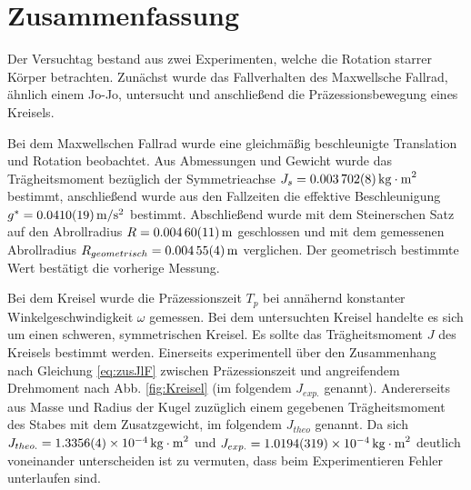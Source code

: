 
\section{Zusammenfassung}\label{kap:Zusammenfassung}

Der Versuchtag bestand aus zwei Experimenten, welche die Rotation starrer Körper betrachten. Zunächst wurde das Fallverhalten des Maxwellsche Fallrad, ähnlich einem Jo-Jo, untersucht und anschließend die Präzessionsbewegung eines Kreisels. 



Bei dem Maxwellschen Fallrad wurde eine gleichmäßig beschleunigte Translation und Rotation beobachtet.
Aus Abmessungen und Gewicht wurde das Trägheitsmoment bezüglich der Symmetrieachse $J_s=\SI{0.003702 \pm 0.000008}{kg\cdot m^2}$ bestimmt, anschließend wurde aus den Fallzeiten die effektive Beschleunigung  $g^*=\SI{0.0410 \pm  0.0019}{m \per s \squared}$ bestimmt. Abschließend wurde mit dem Steinerschen Satz auf den Abrollradius $R=\SI{0.00460\pm 0.00011}{m}$ geschlossen und mit dem gemessenen Abrollradius $R_{geometrisch}=\SI{0.00455 \pm 0.00004}{m}$ verglichen. Der geometrisch bestimmte Wert bestätigt die vorherige Messung. 







Bei dem Kreisel wurde die Präzessionszeit $T_p$ bei annähernd konstanter Winkelgeschwindigkeit $\omega$ gemessen. Bei dem untersuchten Kreisel handelte es sich um einen schweren, symmetrischen Kreisel.
Es sollte das Trägheitsmoment $J$ des Kreisels bestimmt werden. Einerseits experimentell über den Zusammenhang nach Gleichung \ref{eq:zusJlF} zwischen Präzessionszeit und angreifendem Drehmoment nach Abb. \ref{fig:Kreisel} (im folgendem $J_{exp.}$ genannt).
Andererseits aus Masse und Radius der Kugel zuzüglich einem gegebenen Trägheitsmoment des Stabes mit dem Zusatzgewicht, im folgendem $J_{theo}$ genannt. Da sich $J_{theo.}=\SI{1,3356+-0,0004e-4}{kg \cdot m^2}$ und $J_{exp.}=\SI{1,0194+-0,0319e-4}{kg \cdot m^2}$ deutlich voneinander unterscheiden ist zu vermuten, dass beim Experimentieren Fehler unterlaufen sind.  
 








